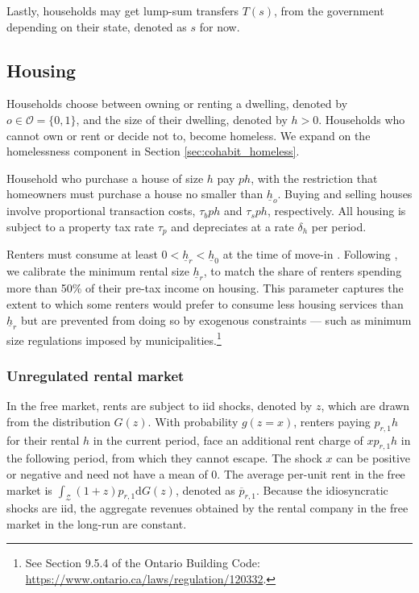 \documentclass[parskip=full]{article}
\begin{document}
Lastly, households may get lump-sum transfers $T(s)$, from the government depending on their state, denoted as $s$ for now.

\subsection{Housing}\label{subsection:housing_choice}

Households choose between owning or renting a dwelling, denoted by $o \in \mathcal{O}=\{0,1\}$, and the size of their dwelling, denoted by $h>0$. Households who cannot own or rent or decide not to, become homeless. We expand on the homelessness component in Section \ref{sec:cohabit_homeless}.

Household who purchase a house of size $h$ pay $p h$, with the restriction that homeowners must purchase a house no smaller than $\underline{h}_{o}$. Buying and selling houses involve proportional transaction costs, $\tau_{b} p h$ and $\tau_{s} p h$, respectively. All housing is subject to a property tax rate $\tau_{p}$ and depreciates at a rate $\delta_h$ per period. 

Renters must consume at least $0<\underline{h}_{r}<\underline{h}_{0}$ at the time of move-in \citep{gervais,sommeretal-2013,sommersullivan-2017,kaplanetal-2019,rs-2023}. Following \citet{rs-2023}, we calibrate the minimum rental size $\underline{h}_{r}$, to match the share of renters spending more than 50\% of their pre-tax income on housing. This parameter captures the extent to which some renters would prefer to consume less housing services than $\underline{h}_{r}$ but are prevented from doing so by exogenous constraints — such as minimum size regulations imposed by municipalities.\footnote{See Section 9.5.4 of the Ontario Building Code: \url{https://www.ontario.ca/laws/regulation/120332}.}

\subsubsection{Unregulated rental market}

In the free market, rents are subject to iid shocks, denoted by $z$, which are drawn from the distribution $G(z)$. With probability $g(z=x)$, renters paying $p_{r,1}h$ for their rental $h$ in the current period, face an additional rent charge of $x p_{r,1}h$ in the following period, from which they cannot escape. The shock $x$ can be positive or negative and need not have a mean of 0. The average per-unit rent in the free market is $\int_\mathcal{Z}(1+z)p_{r,1}\mathrm{d}G(z)$, denoted as $\overline{p}_{r,1}$. Because the idiosyncratic shocks are iid, the aggregate revenues obtained by the rental company in the free market in the long-run are constant. 
\end{document}
